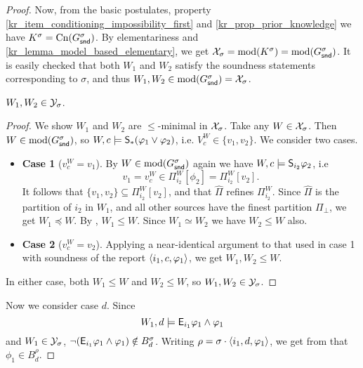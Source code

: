 \begin{proof}
    Now, from the basic postulates, property
    \cref{kr_item_conditioning_impossibility_first} and
    \cref{kr_prop_prior_knowledge} we have $K^\sigma = \cn(G^\sigma_\snd)$. By
    elementariness and \cref{kr_lemma_model_based_elementary}, we get
    $\X_\sigma = \mods(K^\sigma) = \mods(G^\sigma_\snd)$. It is easily checked
    that both $W_1$ and $W_2$ satisfy the soundness statements corresponding to
    $\sigma$, and thus $W_1, W_2 \in \mods(G^\sigma_\snd) = \X_\sigma$.

        \begin{claim}
            \label{kr_claim_w1_w2_in_ysigm}
            $W_1, W_2 \in \Y_\sigma$.
        \end{claim}
        \begin{proof}
            We show $W_1$ and $W_2$ are $\le$-minimal in $\X_\sigma$. Take any
            $W \in \X_\sigma$. Then $W \in \mods(G^\sigma_\snd)$, so $W, c
            \models \S_\ast(\phi_1 \lor \phi_2)$, i.e. $V^W_c \in \{v_1, v_2\}$.
            We consider two cases.
            \begin{itemize}
                \item \textbf{Case 1} ($v^W_c = v_1$). By $W \in
                    \mods(G^\sigma_\snd)$ again we have $W, c \models
                    \S_{i_2}{\phi_2}$, i.e
                    \[
                        v_1
                        = v^W_c
                        \in \Pi^W_{i_2}[\phi_2]
                        = \Pi^W_{i_2}[v_2].
                    \]
                    It follows that $\{v_1, v_2\} \subseteq \Pi^W_{i_2}[v_2]$,
                    and that $\widehat{\Pi}$ refines $\Pi^W_{i_2}$. Since
                    $\widehat{\Pi}$ is the partition of $i_2$ in $W_1$, and all
                    other sources have the finest partition $\Pi_\bot$, we get
                    $W_1 \preceq W$. By , $W_1 \le W$. Since $W_1
                    \simeq W_2$ we have $W_2 \le W$ also.

                \item \textbf{Case 2} ($v^W_c = v_2$). Applying a near-identical
                      argument to that used in case 1 with soundness of the
                      report $\tuple{i_1, c, \phi_1}$, we get $W_1, W_2 \le W$.
            \end{itemize}
            In either case, both $W_1 \le W$ and $W_2 \le W$, so $W_1, W_2 \in
            \Y_\sigma$.
        \end{proof}

    Now we consider case $d$. Since
    \[
        W_1, d \models \E_{i_1}{\phi_1} \land \phi_1
    \]
    and $W_1 \in \Y_\sigma$, $\neg(\E_{i_1}{\phi_1} \land \phi_1) \notin
    B^\sigma_d$. Writing $\rho = \sigma \concat \tuple{i_1, d, \phi_1}$, we get
    from \strongcondsucc{} that $\phi_1 \in B^\rho_d$.


\end{proof}
